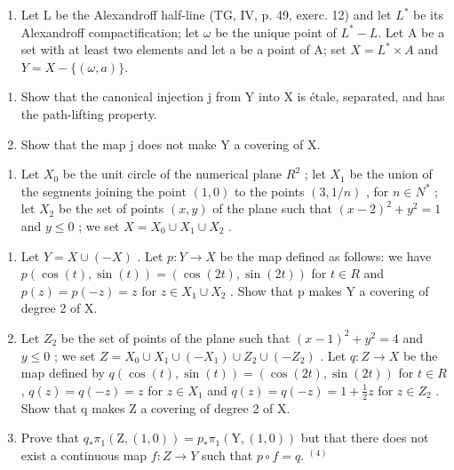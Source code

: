 \begin{enumerate}
\def\labelenumi{\arabic{enumi})}
\setcounter{enumi}{3}
\tightlist
\item
  Let L be the Alexandroff half-line (TG, IV, p. 49, exerc. 12) and let \(L^{*}\) be its Alexandroff compactification; let \(\omega\) be the unique point of \(L^{*} - L\). Let A be a set with at least two elements and let a be a point of A; set \(X = L^{*} \times A\) and \(Y = X - \{(\omega, a)\}\).
\end{enumerate}

\begin{enumerate}
\def\labelenumi{\alph{enumi})}
\item
  Show that the canonical injection j from Y into X is étale, separated, and has the path-lifting property.
\item
  Show that the map j does not make Y a covering of X.
\end{enumerate}

\begin{enumerate}
\def\labelenumi{\arabic{enumi})}
\setcounter{enumi}{4}
\tightlist
\item
  Let \(X_{0}\) be the unit circle of the numerical plane \(R^{2}\) ; let \(X_{1}\) be the union of the segments joining the point \((1,0)\) to the points \((3,1/n)\) , for \(n \in N^{*}\) ; let \(X_{2}\) be the set of points \((x,y)\) of the plane such that \((x-2)^{2} + y^{2} = 1\) and \(y \leqslant 0\) ; we set \(X = X_{0} \cup X_{1} \cup X_{2}\) .
\end{enumerate}

\begin{enumerate}
\def\labelenumi{\alph{enumi})}
\item
  Let \(Y = X \cup (-X)\) . Let \(p: Y \to X\) be the map defined as follows: we have \(p(\cos(t), \sin(t)) = (\cos(2t), \sin(2t))\) for \(t \in R\) and \(p(z) = p(-z) = z\) for \(z \in X_{1} \cup X_{2}\) . Show that p makes Y a covering of degree 2 of X.
\item
  Let \(Z_{2}\) be the set of points of the plane such that \((x-1)^{2}+y^{2}=4\) and \(y\leqslant0\) ; we set \(Z=X_{0}\cup X_{1}\cup(-X_{1})\cup Z_{2}\cup(-Z_{2})\) . Let \(q:Z\to X\) be the map defined by \(q(\cos(t),\sin(t))=(\cos(2t),\sin(2t))\) for \(t\in R\) , \(q(z)=q(-z)=z\) for \(z\in X_{1}\) and \(q(z)=q(-z)=1+\frac{1}{2}z\) for \(z\in Z_{2}\) . Show that q makes Z a covering of degree 2 of X.
\item
  Prove that \(q_{*}\pi_{1}(\mathrm{Z},(1,0)) = p_{*}\pi_{1}(\mathrm{Y},(1,0))\) but that there does not exist a continuous map \(f\colon Z \to Y\) such that \(p \circ f = q\). \(^{(4)}\)
\end{enumerate}

